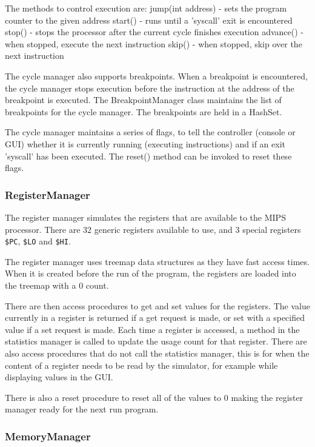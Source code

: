 The methods to control execution are:
jump(int address) - sets the program counter to the given address
start() - runs until a 'syscall' exit is encountered
stop() - stops the processor after the current cycle finishes execution
advance() - when stopped, execute the next instruction 
skip() - when stopped, skip over the next instruction

The cycle manager also supports breakpoints. When a breakpoint is encountered, the cycle manager stops execution before the instruction at the address of the breakpoint is executed. The BreakpointManager class maintains the list of breakpoints for the cycle manager. The breakpoints are held in a HashSet.

The cycle manager maintains a series of flags, to tell the controller (console or GUI) whether it is currently running (executing instructions) and if an exit 'syscall' has been executed. The reset() method can be invoked to reset these flags.

\subsubsection{RegisterManager}

The register manager simulates the registers that are available to the MIPS processor.  There are 32 generic registers available to use, and 3 special registers \verb"$PC", \verb"$LO" and \verb"$HI".

The register manager uses treemap data structures as they have fast access times.  When it is created before the run of the program, the registers are loaded into the treemap with a 0 count.

There are then access procedures to get and set values for the registers.  The value currently in a register is returned if a get request is made, or set with a specified value if a set request is made.  Each time a register is accessed, a method in the statistics manager is called to update the usage count for that
register.  There are also access procedures that do not call the statistics manager, this is for when the content of a register needs to be read by the simulator, for example while displaying values in the GUI.

There is also a reset procedure to reset all of the values to 0 making the register manager ready for the next run program.

\subsubsection{MemoryManager}

